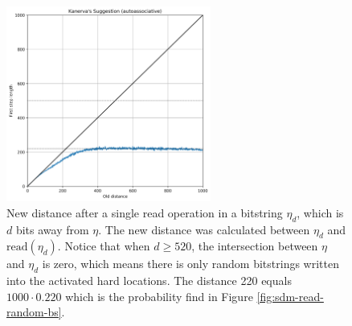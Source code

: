 \begin{figure}[!htb]
  \centering
  \includegraphics[width=0.6\textwidth]{./images02/autocorrelation/single-read-dist.png}

  \caption{New distance after a single read operation in a bitstring $\eta_d$, which is $d$ bits away from $\eta$. The new distance was calculated between $\eta_d$ and $\text{read}(\eta_d)$. Notice that when $d \ge 520$, the intersection between $\eta$ and $\eta_d$ is zero, which means there is only random bitstrings written into the activated hard locations. The distance 220 equals $1000 \cdot 0.220$ which is the probability find in Figure \ref{fig:sdm-read-random-bs}.}
  \label{fig:sdm-single-read-dist}
\end{figure}
